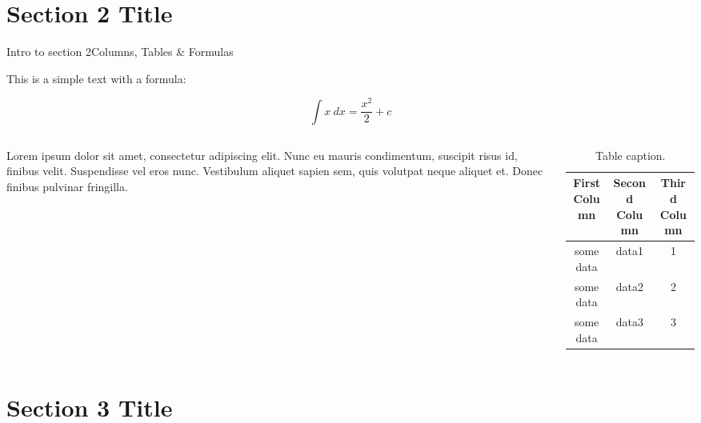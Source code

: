 \documentclass[aspectratio=169]{beamer}
\begin{document}
\section[Short Name 2]{Section 2 Title}


\begin{frame}{Intro to section 2}{Columns, Tables \& Formulas}

\vspace{.5cm}

This is a simple text with a formula:

\begin{equation*}
\int x \ dx = \dfrac{x^2}{2} + c
\end{equation*}


\begin{columns}[T]
\begin{column}{.5\textwidth}
\vspace{.25cm}
\small
Lorem ipsum dolor sit amet, consectetur adipiscing elit. Nunc eu mauris condimentum, suscipit risus id, finibus velit. Suspendisse vel eros nunc. Vestibulum aliquet sapien sem, quis volutpat neque aliquet et. Donec finibus pulvinar fringilla. 

\end{column}
\begin{column}{.5\textwidth}
\small
\begin{table}[h]
\begin{tabular}{ccc}
\toprule
First Column & Second Column & Third Column \\
\midrule
some data & data1 & 1\\
some data & data2 & 2\\
some data & data3 & 3\\
\bottomrule
\end{tabular}
\caption{Table caption.}
\end{table}

\end{column}
\end{columns}

\end{frame}

\section[Short Name 3]{Section 3 Title}
\end{document}

